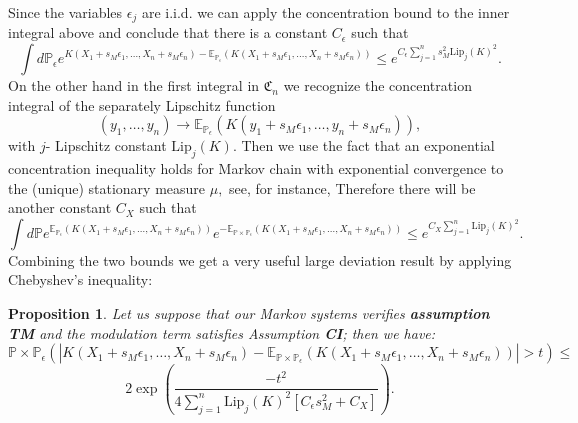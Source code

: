 \documentclass{article}
\newcommand{\1}{\mathbbm{1}}
\newtheorem{proposition}[theorem]{Proposition}
\begin{document}
Since the variables $\epsilon_j$ are i.i.d. we can apply the concentration bound to the inner integral above and conclude that there is a constant $C_{\epsilon}$  such that 
$$
\int d\mathbb{P}_{\epsilon}e^{K(X_1+s_M\epsilon_1,\dots,X_n+s_M\epsilon_n)-\mathbb{E}_{\mathbb{P}_{\epsilon}}(K(X_1+s_M\epsilon_1,\dots,X_n+s_M\epsilon_n))}\le e^{C_{\epsilon} \sum_{j=1}^n s_M^2 \text{Lip}_j(K)^2}.
$$
On the other hand in the first integral in $\mathfrak{C}_n$ we recognize the concentration integral of the separately Lipschitz function
$$
(y_1, \dots, y_n)\rightarrow \mathbb{E}_{\mathbb{P}_{\epsilon}}(K(y_1+s_M\epsilon_1,\dots,y_n+s_M\epsilon_n)),
$$
with $j$- Lipschitz constant $\text{Lip}_j(K).$ 
Then we use the fact that an exponential concentration inequality holds for Markov chain with exponential convergence to the (unique) stationary measure $\mu,$ see, for instance, \cite{paulin} 
Therefore there will be another constant $C_X$ such that 
$$
\int d\mathbb{P}  e^{\mathbb{E}_{\mathbb{P}_{\epsilon}}(K(X_1+s_M\epsilon_1,\dots,X_n+s_M\epsilon_n))}e^{-\mathbb{E}_{\mathbb{P}\times\mathbb{P}_{\epsilon}}(K(X_1+s_M\epsilon_1,\dots,X_n+s_M\epsilon_n))}\le  e^{C_{X} \sum_{j=1}^n \text{Lip}_j(K)^2}.
$$
Combining the two bounds we get a very useful large deviation result by applying Chebyshev's inequality:
\begin{proposition}
Let us suppose that our Markov systems verifies {\bf assumption TM} and the modulation term satisfies Assumption {\bf CI}; then  we have:
    $$
\mathbb{P}\times \mathbb{P}_{\epsilon}\left(|K(X_1+s_M\epsilon_1,\dots,X_n+s_M\epsilon_n)-\mathbb{E}_{\mathbb{P}\times \mathbb{P}_{\epsilon}}(K(X_1+s_M\epsilon_1,\dots,X_n+s_M\epsilon_n))|>t\right)\le
$$
$$
2\exp\left(\frac{-t^2}{4\sum_{j=1}^n \mbox{Lip}_j(K)^2[C_{\epsilon}s_M^2+C_X]}\right).
$$
\end{proposition}
\end{document}
